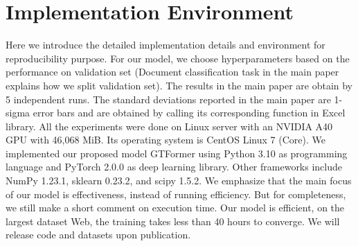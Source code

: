 \section{Implementation Environment}
\label{sec:implementation_environment}

Here we introduce the detailed implementation details and environment for reproducibility purpose. For our model, we choose hyperparameters based on the performance on validation set (Document classification task in the main paper explains how we split validation set). The results in the main paper are obtain by 5 independent runs. The standard deviations reported in the main paper are 1-sigma error bars and are obtained by calling its corresponding function in Excel library. All the experiments were done on Linux server with an NVIDIA A40 GPU with 46,068 MiB. Its operating system is CentOS Linux 7 (Core). We implemented our proposed model GTFormer using Python 3.10 as programming language and PyTorch 2.0.0 as deep learning library. Other frameworks include NumPy 1.23.1, sklearn 0.23.2, and scipy 1.5.2. We emphasize that the main focus of our model is effectiveness, instead of running efficiency. But for completeness, we still make a short comment on execution time. Our model is efficient, on the largest dataset Web, the training takes less than 40 hours to converge. We will release code and datasets upon publication.
